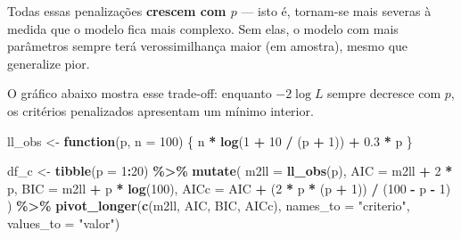 \documentclass[
]{article}
\newenvironment{Shaded}{\begin{snugshade}}{\end{snugshade}}
\newcommand{\AttributeTok}[1]{\textcolor[rgb]{0.13,0.29,0.53}{#1}}
\newcommand{\ControlFlowTok}[1]{\textcolor[rgb]{0.13,0.29,0.53}{\textbf{#1}}}
\newcommand{\DecValTok}[1]{\textcolor[rgb]{0.00,0.00,0.81}{#1}}
\newcommand{\FloatTok}[1]{\textcolor[rgb]{0.00,0.00,0.81}{#1}}
\newcommand{\FunctionTok}[1]{\textcolor[rgb]{0.13,0.29,0.53}{\textbf{#1}}}
\newcommand{\NormalTok}[1]{#1}
\newcommand{\OtherTok}[1]{\textcolor[rgb]{0.56,0.35,0.01}{#1}}
\newcommand{\SpecialCharTok}[1]{\textcolor[rgb]{0.81,0.36,0.00}{\textbf{#1}}}
\newcommand{\StringTok}[1]{\textcolor[rgb]{0.31,0.60,0.02}{#1}}
\begin{document}
Todas essas penalizações \textbf{crescem com \(p\)} --- isto é,
tornam-se mais severas à medida que o modelo fica mais complexo. Sem
elas, o modelo com mais parâmetros sempre terá verossimilhança maior (em
amostra), mesmo que generalize pior.

O gráfico abaixo mostra esse trade-off: enquanto \(-2\log L\) sempre
decresce com \(p\), os critérios penalizados apresentam um mínimo
interior.

\begin{Shaded}
\begin{Highlighting}[]
\NormalTok{ll\_obs }\OtherTok{\textless{}{-}} \ControlFlowTok{function}\NormalTok{(p, }\AttributeTok{n =} \DecValTok{100}\NormalTok{) \{}
\NormalTok{  n }\SpecialCharTok{*} \FunctionTok{log}\NormalTok{(}\DecValTok{1} \SpecialCharTok{+} \DecValTok{10} \SpecialCharTok{/}\NormalTok{ (p }\SpecialCharTok{+} \DecValTok{1}\NormalTok{)) }\SpecialCharTok{+} \FloatTok{0.3} \SpecialCharTok{*}\NormalTok{ p}
\NormalTok{\}}

\NormalTok{df\_c }\OtherTok{\textless{}{-}} \FunctionTok{tibble}\NormalTok{(}\AttributeTok{p =} \DecValTok{1}\SpecialCharTok{:}\DecValTok{20}\NormalTok{) }\SpecialCharTok{\%\textgreater{}\%}
  \FunctionTok{mutate}\NormalTok{(}
    \AttributeTok{m2ll =} \FunctionTok{ll\_obs}\NormalTok{(p),}
    \AttributeTok{AIC  =}\NormalTok{ m2ll }\SpecialCharTok{+} \DecValTok{2} \SpecialCharTok{*}\NormalTok{ p,}
    \AttributeTok{BIC  =}\NormalTok{ m2ll }\SpecialCharTok{+}\NormalTok{ p }\SpecialCharTok{*} \FunctionTok{log}\NormalTok{(}\DecValTok{100}\NormalTok{),}
    \AttributeTok{AICc =}\NormalTok{ AIC }\SpecialCharTok{+}\NormalTok{ (}\DecValTok{2} \SpecialCharTok{*}\NormalTok{ p }\SpecialCharTok{*}\NormalTok{ (p }\SpecialCharTok{+} \DecValTok{1}\NormalTok{)) }\SpecialCharTok{/}\NormalTok{ (}\DecValTok{100} \SpecialCharTok{{-}}\NormalTok{ p }\SpecialCharTok{{-}} \DecValTok{1}\NormalTok{)}
\NormalTok{  ) }\SpecialCharTok{\%\textgreater{}\%}
  \FunctionTok{pivot\_longer}\NormalTok{(}\FunctionTok{c}\NormalTok{(m2ll, AIC, BIC, AICc), }\AttributeTok{names\_to =} \StringTok{"criterio"}\NormalTok{, }\AttributeTok{values\_to =} \StringTok{"valor"}\NormalTok{)}


\end{Highlighting}
\end{Shaded}
\end{document}
